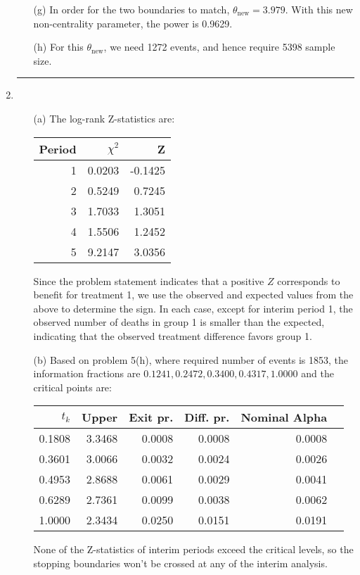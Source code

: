 \documentclass[11pt,a4paper]{article}
\begin{document}
\begin{enumerate}
\begin{enumerate}
\item[(g)] In order for the two boundaries to match, $\theta_{\text{new}} = 3.979$. With this new non-centrality parameter, the power is 0.9629.
\item[(h)] For this $\theta_{\text{new}}$, we need 1272 events, and hence require 5398 sample size.

\end{enumerate}

\rule{\textwidth}{1pt}
\vspace{1in}
\item
\begin{enumerate}
\item[(a)] The log-rank Z-statistics are:
\begin{table}[H]
\centering
\begin{tabular}{rrr}
  \hline
  Period & $\chi^2$ & Z \\ 
  \hline
  1 & 0.0203 & -0.1425 \\ 
  2 & 0.5249 & 0.7245 \\ 
  3 & 1.7033 & 1.3051 \\ 
  4 & 1.5506 & 1.2452 \\ 
  5 & 9.2147 & 3.0356 \\ 
  \hline
\end{tabular}
\end{table}
Since the problem statement indicates that a positive $Z$ corresponds to benefit for treatment 1, we use the observed and expected values from the above to determine the sign. In each case, except for interim period 1, the observed number of deaths in group 1 is smaller than the expected, indicating that the observed treatment difference favors group 1.

\item[(b)] Based on problem 5(h), where required number of events is 1853, the information fractions are $0.1241, 0.2472, 0.3400, 0.4317, 1.0000$ and the critical points are:
\begin{table}[H]
\centering
\begin{tabular}{rrrrrr}
  \hline
  $t_k$ & Upper & Exit pr. & Diff. pr. & Nominal Alpha \\ 
  \hline
  0.1808 & 3.3468 & 0.0008 & 0.0008 & 0.0008 \\ 
  0.3601 & 3.0066 & 0.0032 & 0.0024 & 0.0026 \\ 
  0.4953 & 2.8688 & 0.0061 & 0.0029 & 0.0041 \\ 
  0.6289 & 2.7361 & 0.0099 & 0.0038 & 0.0062 \\ 
  1.0000 & 2.3434 & 0.0250 & 0.0151 & 0.0191 \\ 
  \hline
\end{tabular}
\end{table}
None of the Z-statistics of interim periods exceed the critical levels, so the stopping boundaries won't be crossed at any of the interim analysis. 


\end{enumerate}
\end{enumerate}
\end{document}
